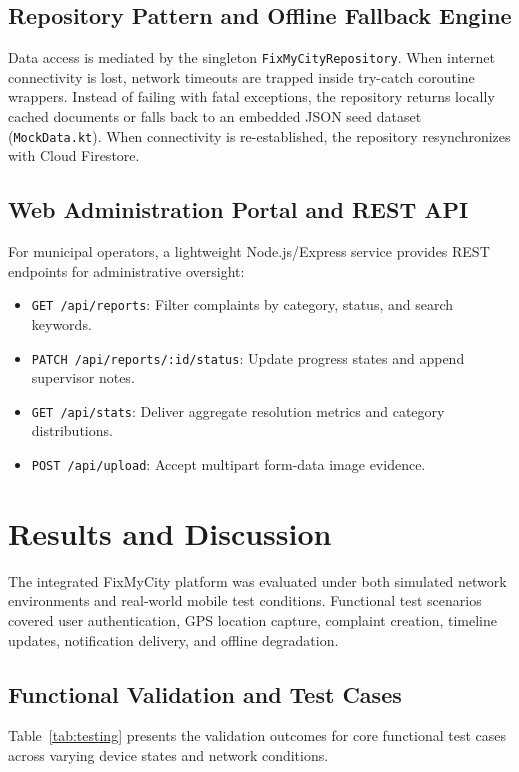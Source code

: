 \documentclass[conference]{IEEEtran}
\begin{document}
\subsection{Repository Pattern and Offline Fallback Engine}
Data access is mediated by the singleton \texttt{FixMyCityRepository}. When internet connectivity is lost, network timeouts are trapped inside try-catch coroutine wrappers. Instead of failing with fatal exceptions, the repository returns locally cached documents or falls back to an embedded JSON seed dataset (\texttt{MockData.kt}). When connectivity is re-established, the repository resynchronizes with Cloud Firestore.

\subsection{Web Administration Portal and REST API}
For municipal operators, a lightweight Node.js/Express service provides REST endpoints for administrative oversight:
\begin{itemize}
    \item \texttt{GET /api/reports}: Filter complaints by category, status, and search keywords.
    \item \texttt{PATCH /api/reports/:id/status}: Update progress states and append supervisor notes.
    \item \texttt{GET /api/stats}: Deliver aggregate resolution metrics and category distributions.
    \item \texttt{POST /api/upload}: Accept multipart form-data image evidence.
\end{itemize}

\section{Results and Discussion}

The integrated FixMyCity platform was evaluated under both simulated network environments and real-world mobile test conditions. Functional test scenarios covered user authentication, GPS location capture, complaint creation, timeline updates, notification delivery, and offline degradation.

\subsection{Functional Validation and Test Cases}
Table~\ref{tab:testing} presents the validation outcomes for core functional test cases across varying device states and network conditions.
\end{document}
